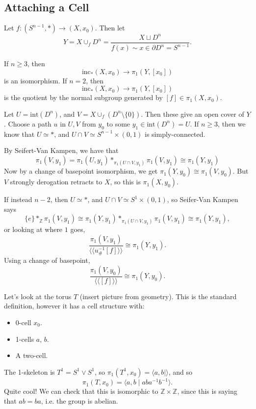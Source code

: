 \documentclass[12pt]{article}
\begin{document}
\subsection{Attaching a Cell}
\label{sub:+_cell}

Let $f : (S^{n-1}, \ast) \to (X, x_0)$. Then let
\[
Y = X \cup_f D^n = \frac{X \sqcup D^n}{f(x) \sim x \in \partial D^n = S^{n-1}}.
\]

\begin{theorem}
	If $n \geq 3$, then
	\[
		\mathrm{inc}_\ast (X, x_0) \to \pi_1(Y, [x_0])
	\]
	is an isomorphism. If $n = 2$, then
	\[
		\mathrm{inc}_\ast (X, x_0) \to \pi_1(Y, [x_0])
	\]
	is the quotient by the normal subgroup generated by $[f] \in \pi_1(X, x_0)$.
\end{theorem}


\begin{proofbox}
	Let $U = \mathrm{int}(D^n)$, and $V = X \cup_f (D^n \setminus \{0\})$. Then these give an open cover of $Y$. Choose a path $u$ in $U, V$ from $y_0$ to some $y_1 \in \mathrm{int}(D^n) = U$. If $n \geq 3$, then we know that $U \simeq \ast$, and $U \cap V \simeq S^{n-1} \times (0, 1)$ is simply-connected.

	By Seifert-Van Kampen, we have that
	\[
	\pi_1(V, y_1) = \pi_1(U, y_1) \ast_{\pi_1(U \cap V, y_1)} \pi_1(V, y_1) \cong \pi_1(Y, y_1)
	\]
	Now by a change of basepoint isomorphism, we get $\pi_1(Y, y_0) \cong \pi_1(V, y_0)$. But $V$ strongly derogation retracts to $X$, so this is $\pi_1(X, y_0)$.

	If instead $n - 2$, then $U \simeq \ast$, and $U \cap V \simeq S^1 \times (0, 1)$, so Seifer-Van Kampen says
	\[
		\{e\} \ast_{\mathbb{Z}} \pi_1(V, y_1) \cong  \pi_1(Y, y_1) \ast_{\pi_1(U \cap V, y_1)} \pi_1(V, y_1) \cong \pi_1(Y, y_1),
	\]
	or looking at where $1$ goes,
	\[
		\frac{\pi_1(V, y_1)}{\langle \langle u^{-1}_\# [f] \rangle \rangle} \cong \pi_1(Y, y_1).
	\]
	Using a change of basepoint,
	\[
		\frac{\pi_1(V, y_0)}{\langle \langle [f] \rangle \rangle} \cong \pi_1(Y, y_0).
	\]
\end{proofbox}

\begin{exbox}
	Let's look at the torus $T$ (insert picture from geometry). This is the standard definition, however it has a cell structure with:
	\begin{itemize}
		\item 0-cell $x_0$.
		\item 1-cells $a$, $b$.
		\item A two-cell.
	\end{itemize}
	The 1-skeleton is $T^1 = S^1 \vee S^1$, so $\pi_1(T^1, x_0) = \langle a, b \mid \rangle$, and so
	\[
	\pi_1(T, x_0) = \langle a, b \mid aba^{-1}b^{-1}\rangle.
	\]
	Quite cool! We can check that this is isomorphic to $\mathbb{Z} \times \mathbb{Z}$, since this is saying that $ab = ba$, i.e. the group is abelian.
\end{exbox}
\end{document}
